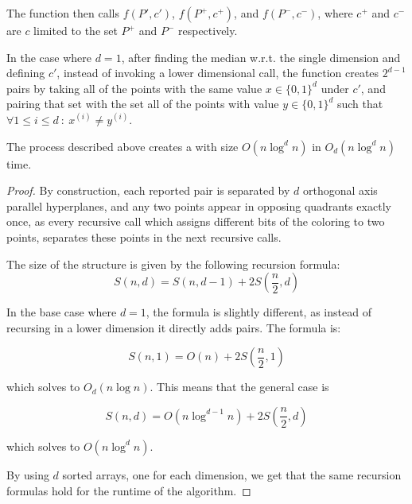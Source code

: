 \documentclass[12pt]{article}%
\begin{document}
The function then calls $f(P', c')$, $f(P^+, c^+)$, and $f(P^-, c^-)$,
where $c^+$ and $c^-$ are $c$ limited to the set $P^+$ and $P^-$
respectively.

In the case where $d=1$, after finding the median w.r.t. the single
dimension and defining $c'$, instead of invoking a lower dimensional
call, the function creates $2^{d-1}$ pairs by taking all of the points
with the same value $x\in\{0,1\}^d$ under $c'$, and pairing that set
with the set all of the points with value $y\in\{0,1\}^d$ such that
$\forall 1\leq i\leq d~:~ x^{(i)}\neq y^{(i)}$.


\begin{claim}
    The process described above creates a \QSPD with size
    $O(n\log^dn)$ in $O_d(n\log^dn)$ time.
\end{claim}

\begin{proof}
    By construction, each reported pair is separated by $d$ orthogonal
    axis parallel hyperplanes, and any two points appear in opposing
    quadrants exactly once, as every recursive call which assigns
    different bits of the coloring to two points, separates these
    points in the next recursive calls.
	
    The size of the structure is given by the following recursion
    formula:
    \begin{equation}
        S(n,d) = S(n,d-1) + 2S\left(\frac{n}{2},d\right)
    \end{equation}
	
    In the base case where $d=1$, the formula is slightly different,
    as instead of recursing in a lower dimension it directly adds
    pairs. The formula is:
	
	\begin{equation}
            S(n,1) = O(n) + 2S\left(\frac{n}{2},1\right)
        \end{equation}
	
	which solves to $O_d(n\log n)$. This means that the general
        case is
	
	\begin{equation}
            S(n,d) = O(n\log^{d-1}n) + 2S\left(\frac{n}{2},d\right)
        \end{equation}
	
	which solves to $O(n\log^d n)$.
	
	By using $d$ sorted arrays, one for each dimension, we get
        that the same recursion formulas hold for the runtime of the
        algorithm.
    \end{proof}
\end{document}
